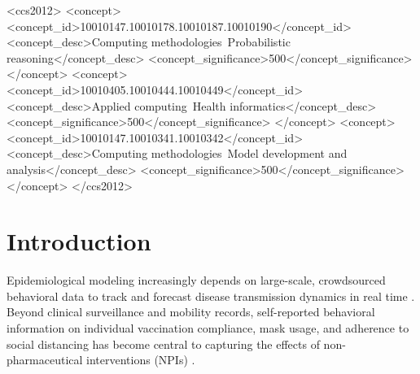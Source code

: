 \documentclass[sigconf,review]{acmart}
\begin{document}

\begin{CCSXML}
<ccs2012>
   <concept>
       <concept_id>10010147.10010178.10010187.10010190</concept_id>
       <concept_desc>Computing methodologies~Probabilistic reasoning</concept_desc>
       <concept_significance>500</concept_significance>
       </concept>
   <concept>
       <concept_id>10010405.10010444.10010449</concept_id>
       <concept_desc>Applied computing~Health informatics</concept_desc>
       <concept_significance>500</concept_significance>
       </concept>
   <concept>
       <concept_id>10010147.10010341.10010342</concept_id>
       <concept_desc>Computing methodologies~Model development and analysis</concept_desc>
       <concept_significance>500</concept_significance>
       </concept>
 </ccs2012>
\end{CCSXML}



\maketitle


\section{Introduction}
Epidemiological modeling increasingly depends on large-scale, crowdsourced behavioral data to track and forecast disease transmission dynamics in real time \cite{banerjee2022,BergstromRS2002}. Beyond clinical surveillance and mobility records, self-reported behavioral information on individual vaccination compliance, mask usage, and adherence to social distancing has become central to capturing the effects of non-pharmaceutical interventions (NPIs) \cite{bff2025}. 
\end{document}

